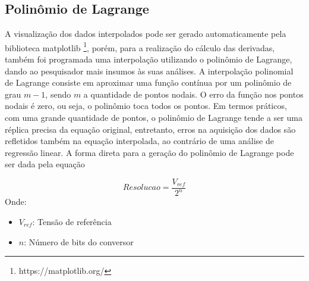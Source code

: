 \subsection{Polinômio de Lagrange}

A visualização dos dados interpolados pode ser gerado automaticamente pela biblioteca matplotlib \footnote{https://matplotlib.org/}, porém, para a realização do cálculo das derivadas, também foi programada uma interpolação utilizando o polinômio de Lagrange, dando ao pesquisador mais insumos às suas análises. A interpolação polinomial de Lagrange consiste em aproximar uma função contínua por um polinômio de grau $m - 1$, sendo $m$ a quantidade de pontos nodais. O erro da função nos pontos nodais é zero, ou seja, o polinômio toca todos os pontos. Em termos práticos, com uma grande quantidade de pontos, o polinômio de Lagrange tende a ser uma réplica precisa da equação original, entretanto, erros na aquisição dos dados são refletidos também na equação interpolada, ao contrário de uma análise de regressão linear. A forma direta para a geração do polinômio de Lagrange pode ser dada pela equação 

\begin{equation} \label{eq:}
Resolucao = \dfrac{V_{ref}}{2^n}
\end{equation}
Onde:
\begin{itemize}[label=]
	\item $V_{ref}$: Tensão de referência
	\item $n$: Número de bits do conversor
\end{itemize} 